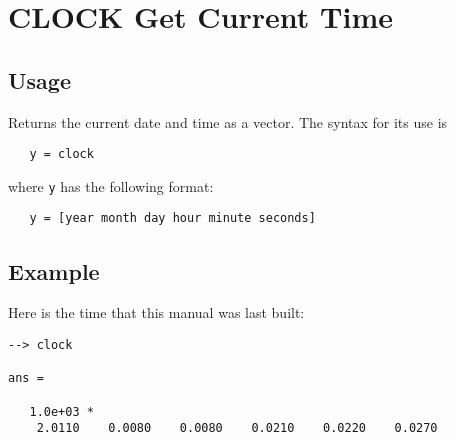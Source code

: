\section{CLOCK Get Current Time}

\subsection{Usage}

Returns the current date and time as a vector.  The syntax for its use is
\begin{verbatim}
   y = clock
\end{verbatim}
where \verb|y| has the following format:
\begin{verbatim}
   y = [year month day hour minute seconds]
\end{verbatim}
\subsection{Example}

Here is the time that this manual was last built:
\begin{verbatim}
--> clock

ans = 

   1.0e+03 * 
    2.0110    0.0080    0.0080    0.0210    0.0220    0.0270 
\end{verbatim}
